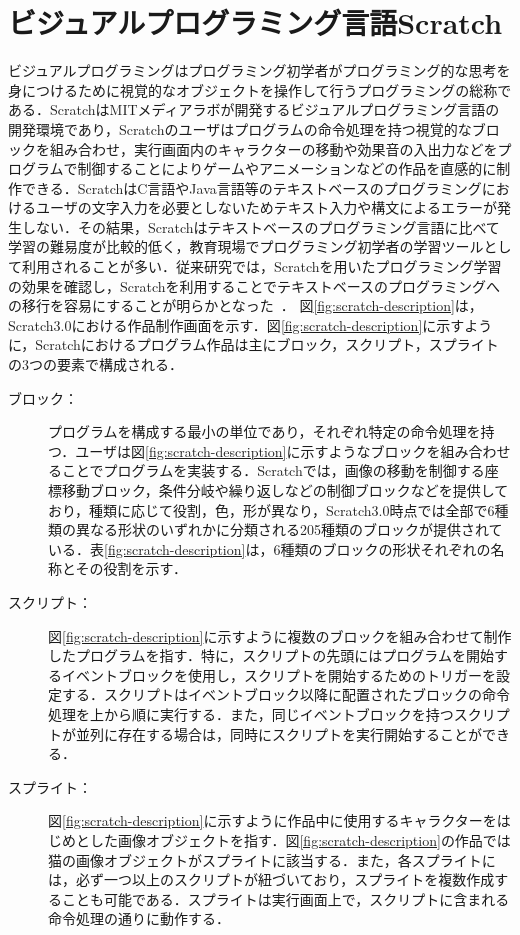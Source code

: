 \documentclass[11pt,dvipdfmx]{jreport}
\begin{document}
\section{ビジュアルプログラミング言語Scratch}
ビジュアルプログラミングはプログラミング初学者がプログラミング的な思考を身につけるために視覚的なオブジェクトを操作して行うプログラミングの総称である．ScratchはMITメディアラボが開発するビジュアルプログラミング言語の開発環境であり，Scratchのユーザはプログラムの命令処理を持つ視覚的なブロックを組み合わせ，実行画面内のキャラクターの移動や効果音の入出力などをプログラムで制御することによりゲームやアニメーションなどの作品を直感的に制作できる．ScratchはC言語やJava言語等のテキストベースのプログラミングにおけるユーザの文字入力を必要としないためテキスト入力や構文によるエラーが発生しない．その結果，Scratchはテキストベースのプログラミング言語に比べて学習の難易度が比較的低く，教育現場でプログラミング初学者の学習ツールとして利用されることが多い．従来研究では，Scratchを用いたプログラミング学習の効果を確認し，Scratchを利用することでテキストベースのプログラミングへの移行を容易にすることが明らかとなった~\cite{Weintrop_2017}．
図\ref{fig:scratch-description}は，Scratch3.0における作品制作画面を示す．図\ref{fig:scratch-description}に示すように，Scratchにおけるプログラム作品は主にブロック，スクリプト，スプライトの3つの要素で構成される．
\begin{description}
\item [ブロック：]プログラムを構成する最小の単位であり，それぞれ特定の命令処理を持つ．ユーザは図\ref{fig:scratch-description}に示すようなブロックを組み合わせることでプログラムを実装する．Scratchでは，画像の移動を制御する座標移動ブロック，条件分岐や繰り返しなどの制御ブロックなどを提供しており，種類に応じて役割，色，形が異なり，Scratch3.0時点では全部で6種類の異なる形状のいずれかに分類される205種類のブロックが提供されている．表\ref{fig:scratch-description}は，6種類のブロックの形状それぞれの名称とその役割を示す．
\item [スクリプト：]図\ref{fig:scratch-description}に示すように複数のブロックを組み合わせて制作したプログラムを指す．特に，スクリプトの先頭にはプログラムを開始するイベントブロックを使用し，スクリプトを開始するためのトリガーを設定する．スクリプトはイベントブロック以降に配置されたブロックの命令処理を上から順に実行する．また，同じイベントブロックを持つスクリプトが並列に存在する場合は，同時にスクリプトを実行開始することができる．
\item [スプライト：]図\ref{fig:scratch-description}に示すように作品中に使用するキャラクターをはじめとした画像オブジェクトを指す．図\ref{fig:scratch-description}の作品では猫の画像オブジェクトがスプライトに該当する．また，各スプライトには，必ず一つ以上のスクリプトが紐づいており，スプライトを複数作成することも可能である．スプライトは実行画面上で，スクリプトに含まれる命令処理の通りに動作する．
\end{description}
\end{document}

